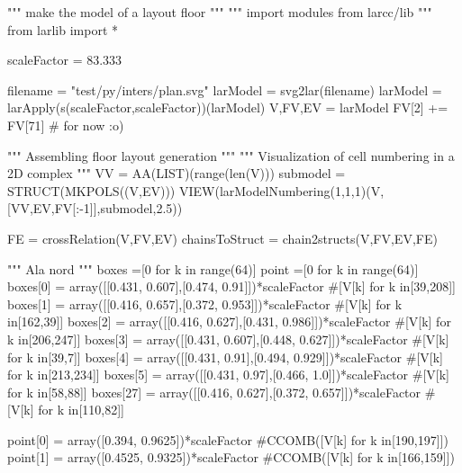 \providecommand{\NWtxtMacroDefBy}{Macro defined by}
\providecommand{\NWtxtMacroRefIn}{Macro referenced in}
\providecommand{\NWtxtMacroNoRef}{Macro never referenced}
\providecommand{\NWtxtDefBy}{Defined by}
\providecommand{\NWtxtRefIn}{Referenced in}
\providecommand{\NWtxtNoRef}{Not referenced}
\providecommand{\NWtxtFileDefBy}{File defined by}
\providecommand{\NWsep}{${\diamond}$}
\providecommand{\NWlink}[2]{\hyperlink{#1}{#2}}
\providecommand{\NWtarget}[2]{%
  \raisebox{\baselineskip}[1.5ex][0ex]{%
    \mbox{%
      \hypertarget{#1}{%
        \raisebox{-1\baselineskip}[0ex][0ex]{%
          \mbox{#2}%
}}}}}

""" make the model of a layout floor """
""" import modules from larcc/lib """
from larlib import *

scaleFactor = 83.333

filename = "test/py/inters/plan.svg"
larModel = svg2lar(filename)
larModel = larApply(s(scaleFactor,scaleFactor))(larModel)
V,FV,EV = larModel
FV[2] += FV[71]      # for now :o)

""" Assembling floor layout generation """
""" Visualization of cell numbering in a 2D complex """
VV = AA(LIST)(range(len(V)))
submodel = STRUCT(MKPOLS((V,EV)))
VIEW(larModelNumbering(1,1,1)(V,[VV,EV,FV[:-1]],submodel,2.5))

FE = crossRelation(V,FV,EV)
chainsToStruct = chain2structs(V,FV,EV,FE)

""" Ala nord """
boxes =[0 for k in range(64)]
point =[0 for k in range(64)]
boxes[0] = array([[0.431, 0.607],[0.474, 0.91]])*scaleFactor #[V[k] for k in[39,208]]
boxes[1] = array([[0.416, 0.657],[0.372, 0.953]])*scaleFactor #[V[k] for k in[162,39]]
boxes[2] = array([[0.416, 0.627],[0.431, 0.986]])*scaleFactor #[V[k] for k in[206,247]]
boxes[3] = array([[0.431, 0.607],[0.448, 0.627]])*scaleFactor #[V[k] for k in[39,7]]
boxes[4] = array([[0.431, 0.91],[0.494, 0.929]])*scaleFactor  #[V[k] for k in[213,234]]
boxes[5] = array([[0.431, 0.97],[0.466, 1.0]])*scaleFactor #[V[k] for k in[58,88]]
boxes[27] = array([[0.416, 0.627],[0.372, 0.657]])*scaleFactor #[V[k] for k in[110,82]]

point[0] = array([0.394, 0.9625])*scaleFactor #CCOMB([V[k] for k in[190,197]])
point[1] = array([0.4525, 0.9325])*scaleFactor #CCOMB([V[k] for k in[166,159]])

